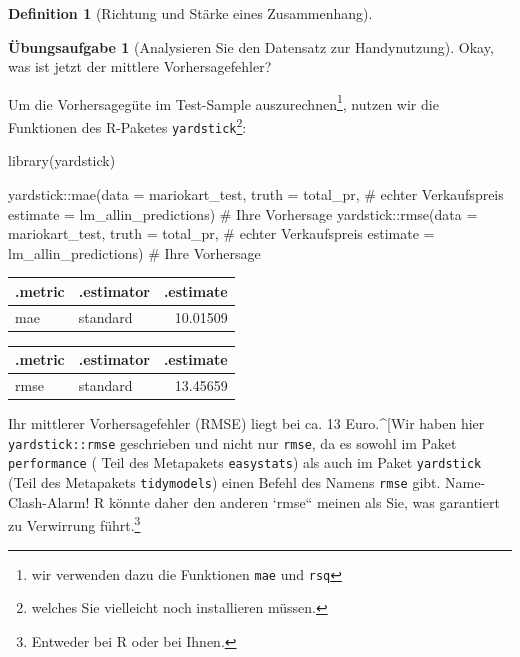\documentclass[
  a4paper,
  DIV=11]{scrreprt}
\newenvironment{Shaded}{\begin{snugshade}}{\end{snugshade}}
\newcommand{\AttributeTok}[1]{\textcolor[rgb]{0.40,0.45,0.13}{#1}}
\newcommand{\CommentTok}[1]{\textcolor[rgb]{0.37,0.37,0.37}{#1}}
\newcommand{\FunctionTok}[1]{\textcolor[rgb]{0.28,0.35,0.67}{#1}}
\newcommand{\NormalTok}[1]{\textcolor[rgb]{0.00,0.23,0.31}{#1}}
\newcommand{\SpecialCharTok}[1]{\textcolor[rgb]{0.37,0.37,0.37}{#1}}
\theoremstyle{definition}
\newtheorem{exercise}{Übungsaufgabe}[chapter]
\theoremstyle{definition}
\theoremstyle{definition}
\newtheorem{definition}{Definition}[chapter]
\theoremstyle{remark}
\begin{document}
\begin{definition}[Richtung und Stärke eines
Zusammenhang]
\begin{exercise}[Analysieren Sie den Datensatz zur
Handynutzung]
Okay, was ist jetzt der mittlere Vorhersagefehler?

Um die Vorhersagegüte im Test-Sample auszurechnen\footnote{wir verwenden
  dazu die Funktionen \texttt{mae} und \texttt{rsq}}, nutzen wir die
Funktionen des R-Paketes \texttt{yardstick}\footnote{welches Sie
  vielleicht noch installieren müssen.}:

\begin{Shaded}
\begin{Highlighting}[]
\FunctionTok{library}\NormalTok{(yardstick)}

\NormalTok{yardstick}\SpecialCharTok{::}\FunctionTok{mae}\NormalTok{(}\AttributeTok{data =}\NormalTok{ mariokart\_test,}
               \AttributeTok{truth =}\NormalTok{ total\_pr,  }\CommentTok{\# echter Verkaufspreis}
               \AttributeTok{estimate =}\NormalTok{ lm\_allin\_predictions)  }\CommentTok{\# Ihre Vorhersage}
\NormalTok{yardstick}\SpecialCharTok{::}\FunctionTok{rmse}\NormalTok{(}\AttributeTok{data =}\NormalTok{ mariokart\_test,}
               \AttributeTok{truth =}\NormalTok{ total\_pr,  }\CommentTok{\# echter Verkaufspreis}
               \AttributeTok{estimate =}\NormalTok{ lm\_allin\_predictions)  }\CommentTok{\# Ihre Vorhersage}
\end{Highlighting}
\end{Shaded}

\begin{longtable}[]{@{}llr@{}}
\toprule\noalign{}
.metric & .estimator & .estimate \\
\midrule\noalign{}
\endhead
\bottomrule\noalign{}
\endlastfoot
mae & standard & 10.01509 \\
\end{longtable}

\begin{longtable}[]{@{}llr@{}}
\toprule\noalign{}
.metric & .estimator & .estimate \\
\midrule\noalign{}
\endhead
\bottomrule\noalign{}
\endlastfoot
rmse & standard & 13.45659 \\
\end{longtable}

Ihr mittlerer Vorhersagefehler (RMSE) liegt bei ca. 13 Euro.\^{}{[}Wir
haben hier \texttt{yardstick::rmse} geschrieben und nicht nur
\texttt{rmse}, da es sowohl im Paket \texttt{performance} ( Teil des
Metapakets \texttt{easystats}) als auch im Paket \texttt{yardstick}
(Teil des Metapakets \texttt{tidymodels}) einen Befehl des Namens
\texttt{rmse} gibt. Name-Clash-Alarm! R könnte daher den anderen `rmse``
meinen als Sie, was garantiert zu Verwirrung führt.\footnote{Entweder
  bei R oder bei Ihnen.}


\end{exercise}
\end{definition}
\end{document}
